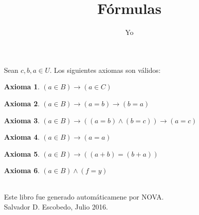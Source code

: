 ﻿\documentclass[12pt]{book}
\title{Fórmulas}
\author{Yo}
\date{}
\newtheorem{axiom}{Axioma}[chapter]
\begin{document}
\maketitle

Sean $c,b,a\in U$. 
Los siguientes axiomas son válidos: 
\begin{axiom}
$(a\in B)\rightarrow (a\in C)$
\end{axiom}
\begin{axiom}
$(a\in B)\rightarrow (a=b)\rightarrow (b=a)$
\end{axiom}
\begin{axiom}
$(a\in B)\rightarrow ((a=b)\wedge (b=c))\rightarrow (a=c)$
\end{axiom}
\begin{axiom}
$(a\in B)\rightarrow (a=a)$
\end{axiom}
\begin{axiom}
$(a\in B)\rightarrow ((a+b)=(b+a))$
\end{axiom}
\begin{axiom}
$(a\in B)\wedge (f=y)$
\end{axiom}
\label{ax: 0}
\\\small{Este libro fue generado automáticamene por NOVA.} \\
\small{Salvador D. Escobedo, Julio 2016}.
\end{document}
